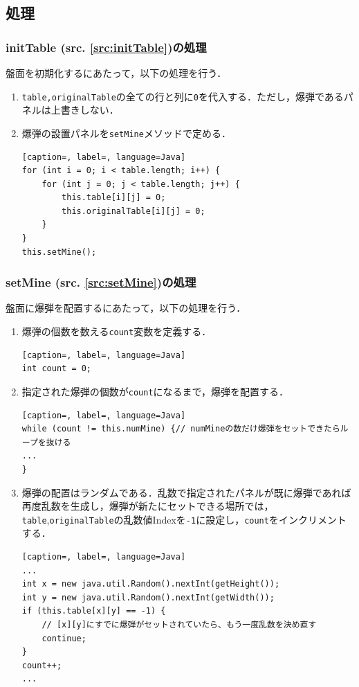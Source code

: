 \documentclass[a4j,11pt]{jsarticle}
\newcommand{\srcref}[1]{src. \ref{#1}}
\newcommand{\met}[1]{\ttfamily #1 \normalfont (\srcref{src:#1})の処理}
\begin{document}
\subsection{処理}
\subsubsection*{\met{initTable}}
盤面を初期化するにあたって，以下の処理を行う．
\begin{enumerate}
    \item \verb|table,originalTable|の全ての行と列に\verb|0|を代入する．ただし，爆弾であるパネルは上書きしない．
    \item 爆弾の設置パネルを\verb|setMine|メソッドで定める．
          \begin{lstlisting}[caption=, label=, language=Java]
for (int i = 0; i < table.length; i++) {
    for (int j = 0; j < table.length; j++) {
        this.table[i][j] = 0;
        this.originalTable[i][j] = 0;
    }
}
this.setMine();
            \end{lstlisting}
\end{enumerate}
\subsubsection*{\met{setMine}}
盤面に爆弾を配置するにあたって，以下の処理を行う．
\begin{enumerate}
    \item 爆弾の個数を数える\verb|count|変数を定義する．
          \begin{lstlisting}[caption=, label=, language=Java]
int count = 0;
\end{lstlisting}
    \item 指定された爆弾の個数が\verb|count|になるまで，爆弾を配置する．
          \begin{lstlisting}[caption=, label=, language=Java]
while (count != this.numMine) {// numMineの数だけ爆弾をセットできたらループを抜ける
...
}
    \end{lstlisting}
    \item 爆弾の配置はランダムである．乱数で指定されたパネルが既に爆弾であれば再度乱数を生成し，爆弾が新たにセットできる場所では，\verb|table|,\verb|originalTable|の乱数値Indexを\verb|-1|に設定し，\verb|count|をインクリメントする．
          \begin{lstlisting}[caption=, label=, language=Java]
...
int x = new java.util.Random().nextInt(getHeight());
int y = new java.util.Random().nextInt(getWidth());
if (this.table[x][y] == -1) {
    // [x][y]にすでに爆弾がセットされていたら、もう一度乱数を決め直す
    continue;
}
count++;
...
    \end{lstlisting}
\end{enumerate}
\newpage
\end{document}
